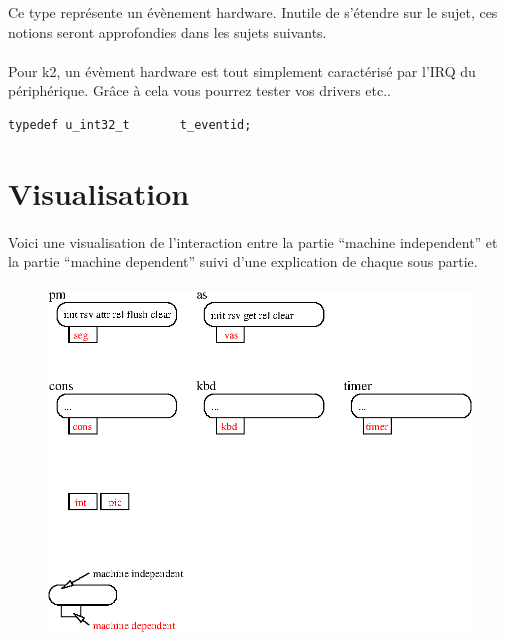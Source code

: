 \documentclass[10pt,a4wide]{article}
\begin{document}
Ce type repr\'esente un \'ev\`enement hardware. Inutile de s'\'etendre sur
le sujet, ces notions seront approfondies dans les sujets suivants.

\paragraph{}

Pour k2, un \'ev\`ement hardware est tout simplement caract\'eris\'e par
l'IRQ du p\'eriph\'erique. Gr\^ace \`a cela vous pourrez tester vos
drivers etc..

\begin{verbatim}
typedef u_int32_t       t_eventid;
\end{verbatim}

\newpage

\section{Visualisation}

\paragraph{}

Voici une visualisation de l'interaction entre la partie
``machine independent'' et la partie ``machine dependent'' suivi
d'une explication de chaque sous partie.

\paragraph{}

\begin{figure}[h]
\centerline{\includegraphics{figures/visualisation.eps}}
\end{figure}
\end{document}
